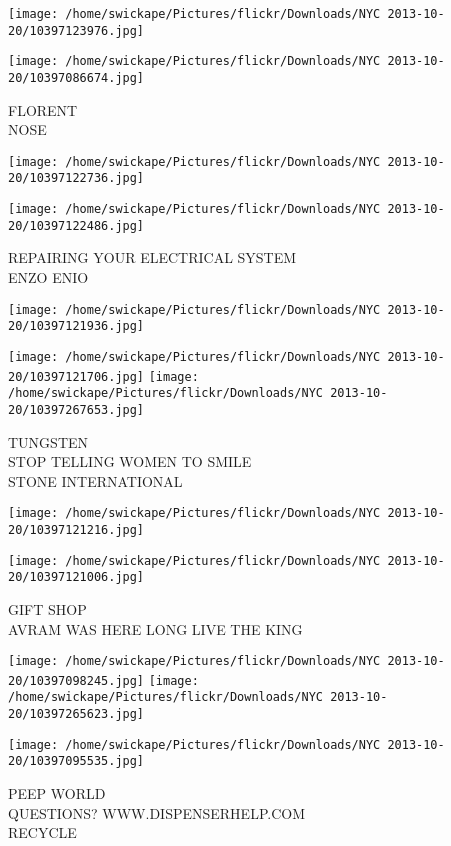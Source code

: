 \documentclass[10pt,letterpaper]{article}
\begin{document}
\texttt{[image: /home/swickape/Pictures/flickr/Downloads/NYC 2013-10-20/10397123976.jpg]}

\vspace{0.25in}
\texttt{[image: /home/swickape/Pictures/flickr/Downloads/NYC 2013-10-20/10397086674.jpg]}

FLORENT\\
NOSE\\
\pagebreak

\texttt{[image: /home/swickape/Pictures/flickr/Downloads/NYC 2013-10-20/10397122736.jpg]}

\vspace{0.25in}
\texttt{[image: /home/swickape/Pictures/flickr/Downloads/NYC 2013-10-20/10397122486.jpg]}

REPAIRING YOUR ELECTRICAL SYSTEM\\
ENZO ENIO\\
\pagebreak

\texttt{[image: /home/swickape/Pictures/flickr/Downloads/NYC 2013-10-20/10397121936.jpg]}

\vspace{0.25in}
\texttt{[image: /home/swickape/Pictures/flickr/Downloads/NYC 2013-10-20/10397121706.jpg]}
\texttt{[image: /home/swickape/Pictures/flickr/Downloads/NYC 2013-10-20/10397267653.jpg]}

TUNGSTEN\\
STOP TELLING WOMEN TO SMILE\\
STONE INTERNATIONAL\\
\pagebreak

\texttt{[image: /home/swickape/Pictures/flickr/Downloads/NYC 2013-10-20/10397121216.jpg]}

\vspace{0.25in}
\texttt{[image: /home/swickape/Pictures/flickr/Downloads/NYC 2013-10-20/10397121006.jpg]}

GIFT SHOP\\
AVRAM WAS HERE LONG LIVE THE KING\\
\pagebreak

\texttt{[image: /home/swickape/Pictures/flickr/Downloads/NYC 2013-10-20/10397098245.jpg]}
\texttt{[image: /home/swickape/Pictures/flickr/Downloads/NYC 2013-10-20/10397265623.jpg]}

\texttt{[image: /home/swickape/Pictures/flickr/Downloads/NYC 2013-10-20/10397095535.jpg]}

PEEP WORLD\\
QUESTIONS?  WWW.DISPENSERHELP.COM\\
RECYCLE\\
\pagebreak
\end{document}

